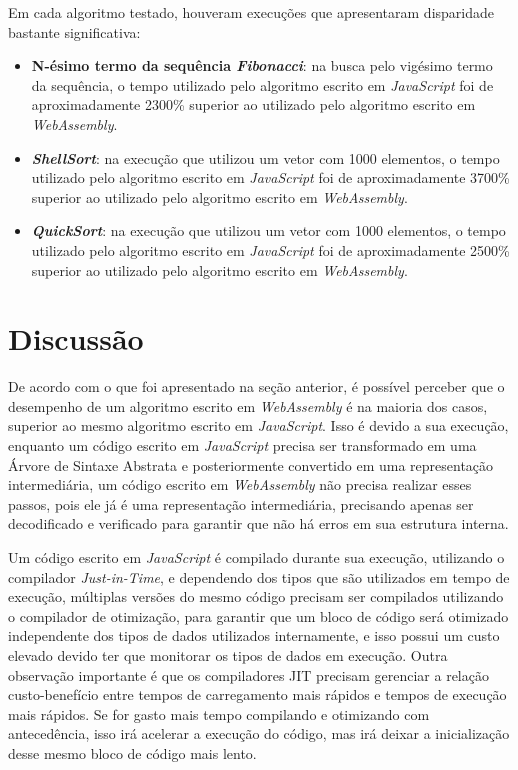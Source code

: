 Em cada algoritmo testado, houveram execuções que apresentaram disparidade bastante
significativa:

\begin{itemize}
    \item \textbf{N-ésimo termo da sequência \textit{Fibonacci}}: na busca pelo vigésimo
    termo da sequência, o tempo utilizado pelo algoritmo escrito em \textit{JavaScript}
    foi de aproximadamente 2300\% superior ao utilizado pelo algoritmo escrito em
    \textit{WebAssembly}.
    \item \textbf{\textit{ShellSort}}: na execução que utilizou um vetor com 1000
    elementos, o tempo utilizado pelo algoritmo escrito em \textit{JavaScript} foi de
    aproximadamente 3700\% superior ao utilizado pelo algoritmo escrito em
    \textit{WebAssembly}.
    \item \textbf{\textit{QuickSort}}: na execução que utilizou um vetor com 1000
    elementos, o tempo utilizado pelo algoritmo escrito em \textit{JavaScript} foi de
    aproximadamente 2500\% superior ao utilizado pelo algoritmo escrito em
    \textit{WebAssembly}.
\end{itemize}

\section{Discussão}
\label{ssec:discussion}

De acordo com o que foi apresentado na seção anterior, é possível perceber que o
desempenho de um algoritmo escrito em \textit{WebAssembly} é na maioria dos casos,
superior ao mesmo algoritmo escrito em \textit{JavaScript}. Isso é devido a sua execução,
enquanto um código escrito em \textit{JavaScript} precisa ser transformado em uma Árvore
de Sintaxe Abstrata e posteriormente convertido em uma representação intermediária, um
código escrito em \textit{WebAssembly} não precisa realizar esses passos, pois ele já é
uma representação intermediária, precisando apenas ser decodificado e verificado para
garantir que não há erros em sua estrutura interna.

Um código escrito em \textit{JavaScript} é compilado durante sua execução, utilizando o
compilador \textit{Just-in-Time}, e dependendo dos tipos que são utilizados em tempo de
execução, múltiplas versões do mesmo código precisam ser compilados utilizando o
compilador de otimização, para garantir que um bloco de código será otimizado
independente dos tipos de dados utilizados internamente, e isso possui um custo elevado
devido ter que monitorar os tipos de dados em execução. Outra observação importante é que
os compiladores JIT precisam gerenciar a relação custo-benefício entre tempos de
carregamento mais rápidos e tempos de execução mais rápidos. Se for gasto mais tempo
compilando e otimizando com antecedência, isso irá acelerar a execução do código, mas irá
deixar a inicialização desse mesmo bloco de código mais lento.

